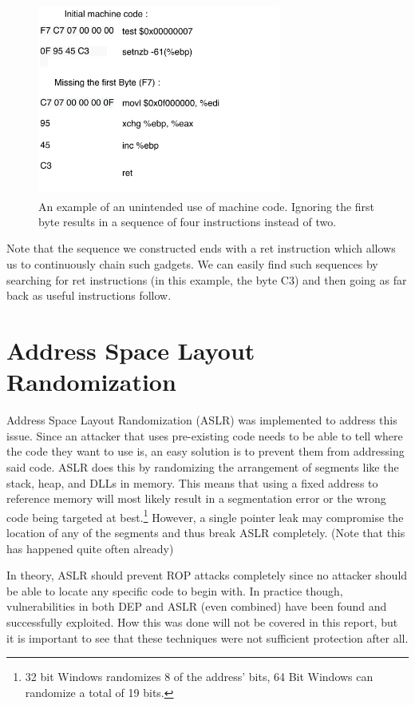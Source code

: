 \documentclass[10pt,twocolumn,a4paper]{article}
\begin{document}
\begin{figure}[h]
  \includegraphics[keepaspectratio,width=8cm]{fig/ByteCode}
  \caption{An example of an unintended use of machine code\textsuperscript{\cite{geometry}}. Ignoring the first byte results in a sequence of four instructions instead of two.}
\end{figure}\newline
Note that the sequence we constructed ends with a ret instruction which allows us to continuously chain such gadgets.
We can easily find such sequences by searching for ret instructions (in this example, the byte C3) and then going as far back as useful instructions follow\cite{gadgets}.

\section{Address Space Layout Randomization}\label{sec:ASLR}
Address Space Layout Randomization (ASLR) was implemented to address this issue.
Since an attacker that uses pre-existing code needs to be able to tell where the code they want to use is, an easy solution is to prevent them from addressing said code.
ASLR does this by randomizing the arrangement of segments like the stack, heap, and DLLs in memory. This means that using a fixed address to reference memory will most likely result in a segmentation error or the wrong code being targeted at best.\footnote{32 bit Windows randomizes 8 of the address' bits, 64 Bit Windows can randomize a total of 19 bits.} However, a single pointer leak may compromise the location of any of the segments and thus break ASLR completely. (Note that this has happened quite often already)

In theory, ASLR should prevent ROP attacks completely since no attacker should be able to locate any specific code to begin with.
In practice though, vulnerabilities in both DEP and ASLR (even combined) have been found and successfully exploited\cite{bypass}.
How this was done will not be covered in this report, but it is important to see that these techniques were not sufficient protection after all.
\end{document}
